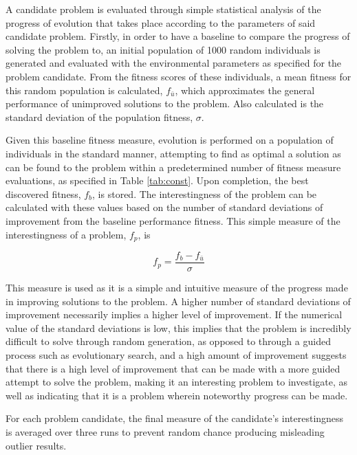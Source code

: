 \documentclass[conference]{IEEEtran}
\begin{document}
A candidate problem is evaluated through simple statistical analysis of the progress of evolution that takes place according to the parameters of said candidate problem. Firstly, in order to have a baseline to compare the progress of solving the problem to, an initial population of 1000 random individuals is generated and evaluated with the environmental parameters as specified for the problem candidate. From the fitness scores of these individuals, a mean fitness for this random population is calculated, $f_{\bar{u}}$, which approximates the general performance of unimproved solutions to the problem. Also calculated is the standard deviation of the population fitness, $\sigma$.

Given this baseline fitness measure, evolution is performed on a population of individuals in the standard manner, attempting to find as optimal a solution as can be found to the problem within a predetermined number of fitness measure evaluations, as specified in Table \ref{tab:const}. Upon completion, the best discovered fitness, $f_{b}$, is stored. The interestingness of the problem can be calculated with these values based on the number of standard deviations of improvement from the baseline performance fitness. This simple measure of the interestingness of a problem, $f_{p}$, is

\begin{equation}
f_{p} = \frac{f_{b} - f_{\bar{u}}}{\sigma}
\end{equation}

This measure is used as it is a simple and intuitive measure of the progress made in improving solutions to the problem. A higher number of standard deviations of improvement necessarily implies a higher level of improvement. If the numerical value of the standard deviations is low, this implies that the problem is incredibly difficult to solve through random generation, as opposed to through a guided process such as evolutionary search, and a high amount of improvement suggests that there is a high level of improvement that can be made with a more guided attempt to solve the problem, making it an interesting problem to investigate, as well as indicating that it is a problem wherein noteworthy progress can be made.

For each problem candidate, the final measure of the candidate's interestingness is averaged over three runs to prevent random chance producing misleading outlier results.
\end{document}
